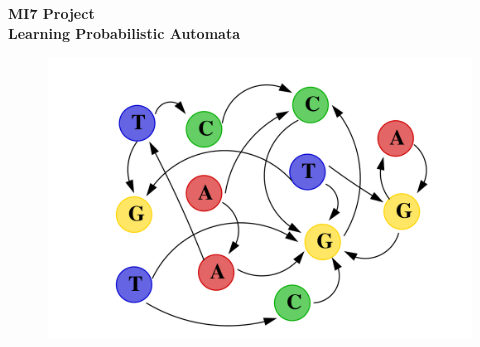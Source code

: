 \begin{titlepage}
	\begin{center}
		\textup{\small {\bf MI7 Project}}\\[0.2in]	
		\Large \textbf {Learning Probabilistic Automata}\\[0.5in]
		
		\begin{figure}[!h]
			\centering
			\includegraphics[width=1\linewidth]{pictures/Frontpage}
			\label{fig:Frontpage}
		\end{figure}
	\end{center}
\end{titlepage}
